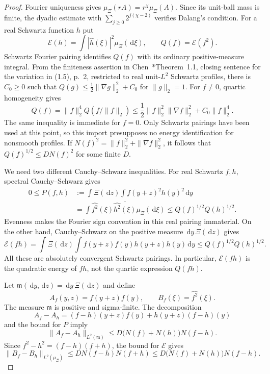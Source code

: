 \documentclass[12pt]{article}
\numberwithin{equation}{section}
\theoremstyle{definition}
\newcommand{\ud}{\,\mathrm{d}}
\begin{document}
\begin{proof}
  Fourier uniqueness gives
  $\mu_\Xi(rA)=r^\chi\mu_\Xi(A)$.
  Since its unit-ball mass is finite, the dyadic estimate with
  $\sum_{j\ge0}2^{j(\chi-2)}$ verifies Dalang's condition.
  For a real Schwartz function $h$ put
  \[
    \mathscr E(h)=\int|\widehat h(\xi)|^2\mu_\Xi(\ud\xi),
    \qquad Q(f)=\mathscr E(f^2).
  \]
  Schwartz Fourier pairing identifies $Q(f)$ with its ordinary
  positive-measure integral. From the finiteness assertion in
  Chen~\cite{chen:23:exponential}*{Theorem~1.1, closing sentence
  for the variation in (1.5), p.~2},
  restricted to real unit-$L^2$ Schwartz profiles, there is $C_0\ge0$
  such that $Q(g)\le\frac12\|\nabla g\|_2^2+C_0$ for $\|g\|_2=1$.
  For $f\ne0$, quartic homogeneity gives
  \[
    Q(f)=\|f\|_2^4Q(f/\|f\|_2)
    \le\frac12\|f\|_2^2\|\nabla f\|_2^2+C_0\|f\|_2^4.
  \]
  The same inequality is immediate for $f=0$.
  Only Schwartz pairings have been used at this point, so this import
  presupposes no energy identification for nonsmooth profiles.
  If $N(f)^2=\|f\|_2^2+\|\nabla f\|_2^2$, it follows that
  $Q(f)^{1/2}\le D N(f)^2$ for some finite $D$.

  We need two different Cauchy--Schwarz inequalities.
  For real Schwartz $f,h$, spectral Cauchy--Schwarz gives
  \[
    \begin{split}
      0\le P(f,h)
      &:=\int\Xi(\ud z)\int f(y+z)^2h(y)^2\ud y\\
      &=\int\widehat{f^2}(\xi)
      \overline{\widehat{h^2}(\xi)}\mu_\Xi(\ud\xi)
      \le Q(f)^{1/2}Q(h)^{1/2}.
    \end{split}
  \]
  Evenness makes the Fourier sign convention in this real pairing
  immaterial. On the other hand, Cauchy--Schwarz on the positive
  measure $\ud y\,\Xi(\ud z)$ gives
  \[
    \mathscr E(fh)
    =\int\Xi(\ud z)\int
    f(y+z)f(y)h(y+z)h(y)\ud y
    \le Q(f)^{1/2}Q(h)^{1/2}.
  \]
  All these are absolutely convergent Schwartz pairings.
  In particular, $\mathscr E(fh)$ is the quadratic energy of $fh$,
  not the quartic expression $Q(fh)$.

  Let $\mathfrak m(\ud y,\ud z)=\ud y\,\Xi(\ud z)$ and define
  \[
    A_f(y,z)=f(y+z)f(y),\qquad B_f(\xi)=\widehat{f^2}(\xi).
  \]
  The measure $\mathfrak m$ is positive and sigma-finite.
  The decomposition
  \[
    A_f-A_h=(f-h)(y+z)f(y)+h(y+z)(f-h)(y)
  \]
  and the bound for $P$ imply
  \[
    \|A_f-A_h\|_{L^2(\mathfrak m)}
    \le D\bigl(N(f)+N(h)\bigr)N(f-h).
  \]
  Since $f^2-h^2=(f-h)(f+h)$, the bound for $\mathscr E$ gives
  \[
    \|B_f-B_h\|_{L^2(\mu_\Xi)}
    \le D N(f-h)N(f+h)
    \le D\bigl(N(f)+N(h)\bigr)N(f-h).
  \]


\end{proof}
\end{document}
